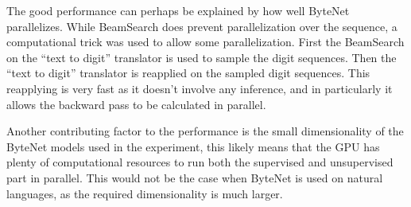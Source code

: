 The good performance can perhaps be explained by how well ByteNet parallelizes. While BeamSearch does prevent parallelization over the sequence, a computational trick was used to allow some parallelization. First the BeamSearch on the ``text to digit'' translator is used to sample the digit sequences. Then the ``text to digit'' translator is reapplied on the sampled digit sequences. This reapplying is very fast as it doesn't involve any inference, and in particularly it allows the backward pass to be calculated in parallel.

Another contributing factor to the performance is the small dimensionality of the ByteNet models used in the experiment, this likely means that the GPU has plenty of computational resources to run both the supervised and unsupervised part in parallel. This would not be the case when ByteNet is used on natural languages, as the required dimensionality is much larger.